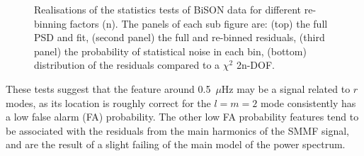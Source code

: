 \begin{figure}[!ht]
	\qquad
	
	\caption{Realisations of the statistics tests of BiSON data for different re-binning factors (n). The panels of each sub figure are: (top) the full PSD and fit, (second panel) the full and re-binned residuals, (third panel) the probability of statistical noise in each bin, (bottom) distribution of the residuals compared to a $\chi^2$ 2n-DOF.}
	\label{fig:BiSON_new_asymm_stats}
\end{figure}


These tests suggest that the feature around 0.5~$\mu$Hz may be a signal related to $r$ modes, as its location is roughly correct for the $l=m=2$ mode consistently has a low false alarm (FA) probability. The other low FA probability features tend to be associated with the residuals from the main harmonics of the SMMF signal, and are the result of a slight failing of the main model of the power spectrum.

